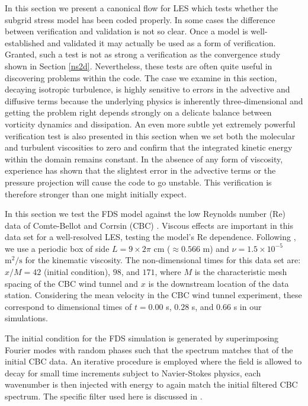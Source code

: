 \documentclass[11pt]{book}
\begin{document}
In this section we present a canonical flow for LES which tests whether the subgrid stress model has been coded properly. In some cases the difference between verification and validation is not so clear.  Once a model is well-established and validated it may actually be used as a form of verification.  Granted, such a test is not as strong a verification as the convergence study shown in Section \ref{ns2d}.  Nevertheless, these tests are often quite useful in discovering problems within the code.  The case we examine in this section, decaying isotropic turbulence, is highly sensitive to errors in the advective and diffusive terms because the underlying physics is inherently three-dimensional and getting the problem right depends strongly on a delicate balance between vorticity dynamics and dissipation.  An even more subtle yet extremely powerful verification test is also presented in this section when we set both the molecular and turbulent viscosities to zero and confirm that the integrated kinetic energy within the domain remains constant.   In the absence of any form of viscosity, experience has shown that the slightest error in the advective terms or the pressure projection will cause the code to go unstable.  This verification is therefore stronger than one might initially expect.

In this section we test the FDS model against the low Reynolds number (Re) data of Comte-Bellot and Corrsin (CBC) \cite{CBC}. Viscous effects are important in this data set for a well-resolved LES, testing the model's Re dependence.  Following \cite{SdBK}, we use a periodic box of side $L = 9 \times 2\pi$ cm ($\approx 0.566$ m) and $\nu = 1.5 \times 10^{-5}$ $\mbox{m}^2/\mbox{s}$ for the kinematic viscosity. The non-dimensional times for this data set are: $x/M = 42$ (initial condition), $98$, and $171$, where $M$ is the characteristic mesh spacing of the CBC wind tunnel and $x$ is the downstream location of the data station. Considering the mean velocity in the CBC wind tunnel experiment, these correspond to dimensional times of $t = 0.00$ s, $0.28$ s, and $0.66$ s in our simulations.

The initial condition for the FDS simulation is generated by superimposing Fourier modes with random phases such that the spectrum matches that of the initial CBC data.  An iterative procedure is employed where the field is allowed to decay for small time increments subject to Navier-Stokes physics, each wavenumber is then injected with energy to again match the initial filtered CBC spectrum.  The specific filter used here is discussed in \cite{McDermott:2005b}.
\end{document}
